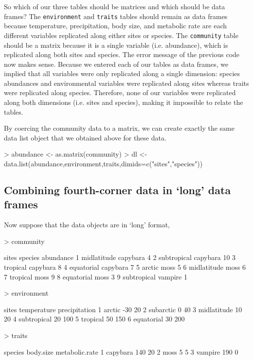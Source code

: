 \documentclass{article}
\newcommand{\code}[1]{\texttt{#1}}
\numberwithin{exercise}{section}
\begin{document}
So which of our three tables should be matrices and which should be data frames?  The \code{environment} and \code{traits} tables should remain as data frames because temperature, precipitation, body size, and metabolic rate are each different variables replicated along either sites or species.  The \code{community} table should be a matrix because it is a single variable (i.e. abundance), which is replicated along both sites and species.  The error message of the previous code now makes sense.  Because we entered each of our tables as data frames, we implied that all variables were only replicated along a single dimension:  species abundances and environmental variables were replicated along sites whereas traits were replicated along species.  Therefore, none of our variables were replicated along both dimensions (i.e. sites and species), making it impossible to relate the tables.

By coercing the community data to a matrix, we can create exactly the same data list object that we obtained above for these data.
\begin{Schunk}
\begin{Sinput}
> abundance <- as.matrix(community)
> dl <- data.list(abundance,environment,traits,dimids=c("sites","species"))
\end{Sinput}
\end{Schunk}

\subsection{Combining fourth-corner data in `long' data frames}

Now suppose that the data objects are in `long' format,


\begin{Schunk}
\begin{Sinput}
> community
\end{Sinput}
\begin{Soutput}
        sites  species abundance
1 midlatitude capybara         4
2 subtropical capybara        10
3    tropical capybara         8
4  equatorial capybara         7
5      arctic     moss         5
6 midlatitude     moss         6
7    tropical     moss         9
8  equatorial     moss         3
9 subtropical  vampire         1
\end{Soutput}
\begin{Sinput}
> environment
\end{Sinput}
\begin{Soutput}
        sites temperature precipitation
1      arctic         -30            20
2   subarctic           0            40
3 midlatitude          10            20
4 subtropical          20           100
5    tropical          50           150
6  equatorial          30           200
\end{Soutput}
\begin{Sinput}
> traits
\end{Sinput}
\begin{Soutput}
   species body.size metabolic.rate
1 capybara       140             20
2     moss         5              5
3  vampire       190              0
\end{Soutput}
\end{Schunk}
\end{document}
